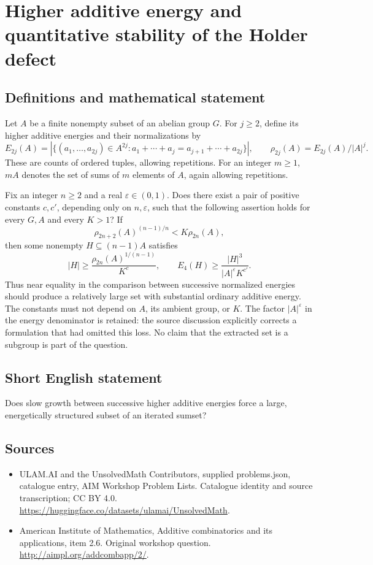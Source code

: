 \documentclass[11pt,a4paper]{article}
\begin{document}
\section*{Higher additive energy and quantitative stability of the Holder defect}\label{statement}

\subsection{Definitions and mathematical statement}
Let $A$ be a finite nonempty subset of an abelian group $G$.
For $j\geq2$, define its higher additive energies and their normalizations by
\[
 E_{2j}(A)=|\{(a_1,\ldots,a_{2j})\in A^{2j}:
       a_1+\cdots+a_j=a_{j+1}+\cdots+a_{2j}\}|,
 \qquad \rho_{2j}(A)=E_{2j}(A)/|A|^j.
\]
These are counts of ordered tuples, allowing repetitions.
For an integer $m\geq1$, $mA$ denotes the set of sums of $m$ elements of $A$, again allowing repetitions.

Fix an integer $n\geq2$ and a real $\varepsilon\in(0,1)$.
Does there exist a pair of positive constants $c,c'$, depending only on $n,\varepsilon$, such that the following assertion holds for every $G,A$ and every $K>1$?
If
\[
 \rho_{2n+2}(A)^{(n-1)/n}<K\rho_{2n}(A),
\]
then some nonempty $H\subseteq(n-1)A$ satisfies
\[
 |H|\geq\frac{\rho_{2n}(A)^{1/(n-1)}}{K^c},
 \qquad E_4(H)\geq\frac{|H|^3}{|A|^{\varepsilon}K^{c'}}.
\]
Thus near equality in the comparison between successive normalized energies should produce a relatively large set with substantial ordinary additive energy.
The constants must not depend on $A$, its ambient group, or $K$.
The factor $|A|^{\varepsilon}$ in the energy denominator is retained: the source discussion explicitly corrects a formulation that had omitted this loss.
No claim that the extracted set is a subgroup is part of the question.
\subsection{Short English statement}
Does slow growth between successive higher additive energies force a large, energetically structured subset of an iterated sumset?
\subsection{Sources}
\begin{itemize}
\item[S1] ULAM.AI and the UnsolvedMath Contributors, supplied problems.json, catalogue entry, AIM Workshop Problem Lists. Catalogue identity and source transcription; CC BY 4.0.
\url{https://huggingface.co/datasets/ulamai/UnsolvedMath}.
\item[S2] American Institute of Mathematics, Additive combinatorics and its applications, item 2.6. Original workshop question.
\url{http://aimpl.org/addcombapp/2/}.
\end{itemize}
\end{document}
